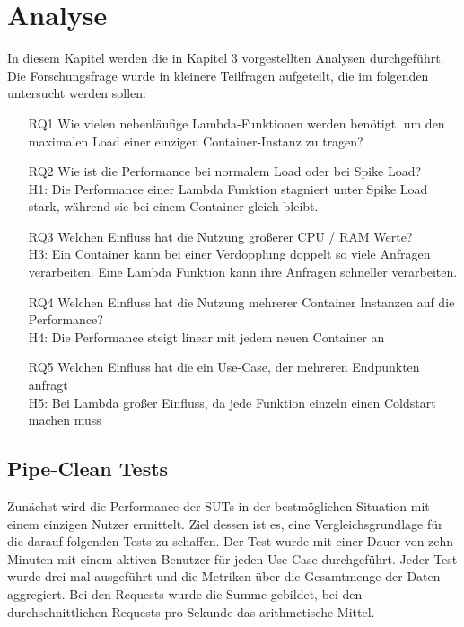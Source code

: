 \chapter{Analyse}
In diesem Kapitel werden die in Kapitel 3 vorgestellten Analysen durchgeführt. Die Forschungsfrage wurde in kleinere Teilfragen aufgeteilt, die im folgenden untersucht werden sollen:

\begin{enumerate}
    \item[RQ1] Wie vielen nebenläufige Lambda-Funktionen werden benötigt, um den maximalen Load einer einzigen Container-Instanz zu tragen?
    
    \item[RQ2] Wie ist die Performance bei normalem Load oder bei Spike Load? \\
    H1: Die Performance einer Lambda Funktion stagniert unter Spike Load stark, während sie bei einem Container gleich bleibt.

    \item[RQ3] Welchen Einfluss hat die Nutzung größerer CPU / RAM Werte? \\
    H3: Ein Container kann bei einer Verdopplung doppelt so viele Anfragen verarbeiten. Eine Lambda Funktion kann ihre Anfragen schneller verarbeiten.
    
    \item[RQ4] Welchen Einfluss hat die Nutzung mehrerer Container Instanzen auf die Performance? \\
    H4: Die Performance steigt linear mit jedem neuen Container an
    
    \item[RQ5] Welchen Einfluss hat die ein Use-Case, der mehreren Endpunkten anfragt\\
    H5: Bei Lambda großer Einfluss, da jede Funktion einzeln einen Coldstart machen muss
\end{enumerate}

\section{Pipe-Clean Tests}
Zunächst wird die Performance der SUTs in der bestmöglichen Situation mit einem einzigen Nutzer ermittelt. Ziel dessen ist es, eine Vergleichsgrundlage für die darauf folgenden Tests zu schaffen. Der Test wurde mit einer Dauer von zehn Minuten mit einem aktiven Benutzer für jeden Use-Case durchgeführt. Jeder Test wurde drei mal ausgeführt und die Metriken über die Gesamtmenge der Daten aggregiert. Bei den Requests wurde die Summe gebildet, bei den durchschnittlichen Requests pro Sekunde das arithmetische Mittel.

